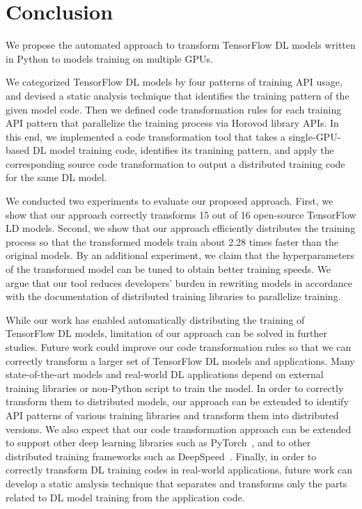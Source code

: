\section{Conclusion}\label{sec:conclusion}
We propose the automated approach to transform TensorFlow DL models written in
Python to models training on multiple GPUs.
\begin{inred}
We categorized TensorFlow DL models by four patterns of training API usage,
and devised a static analysis technique that identifies the training pattern
of the given model code.
Then we defined code transformation rules for each training API pattern
that parallelize the training process via Horovod library APIs.
In this end, we implemented a code transformation tool
that takes a single-GPU-based DL model training code,
identifies its tranining pattern, and apply the corresponding source code
transformation to output a distributed training code for the same DL model.

We conducted two experiments to evaluate our proposed approach.
First, we show that our approach correctly transforms 15 out of 16
open-source TensorFlow LD models.
Second, we show that our approach efficiently distributes the training process
so that the transformed models train about 2.28 times faster than the original models.
By an additional experiment,
we claim that the hyperparameters of the transformed model can be tuned to
obtain better training speeds.
We argue that our tool reduces developers' burden in rewriting models
in accordance with the documentation of distributed training libraries to
parallelize training.

While our work has enabled automatically distributing the training of TensorFlow
DL models, limitation of our approach can be solved in further studies.
Future work could improve our code transformation rules so that 
we can correctly transform a larger set of TensorFlow DL models and applications.
Many state-of-the-art models and real-world DL applications
depend on external training libraries or non-Python script to train the model.
In order to correctly transform them to distributed models,
our approach can be extended to identify API patterns of various training libraries
and transform them into distributed versions.
We also expect that our code transformation approach can be extended to
support other deep learning libraries such as PyTorch~\cite{pytorch2019},
and to other distributed training frameworks such as DeepSpeed~\cite{deepspeed}.
Finally, in order to correctly transform DL training codes in real-world applications,
future work can develop a static analysis technique that separates 
and transforms only the parts related to DL model training from the application code. 


\end{inred}

